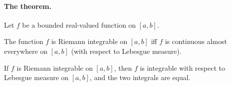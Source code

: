 \documentclass{article} %
\begin{document}
\paragraph{The theorem.}

\begin{theorem}
Let $f$ be a bounded real-valued function on $[a,b]$.	
\begin{alphabate}
\item The function $f$ is Riemann integrable on $[a,b]$ iff $f$ is continuous almost everywhere on $[a,b]$ (with respect to Lebesgue measure).
\item If $f$ is Riemann integrable on $[a,b]$, then $f$ is integrable with respect to Lebesgue measure on $[a,b]$, and the two integrals are equal.	
\end{alphabate}
\end{theorem}
\end{document}
